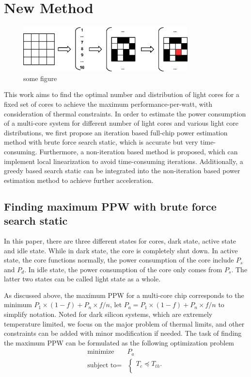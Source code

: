 \section{New Method}


\begin{figure}[htb]
\centering
\includegraphics[width=0.8\textwidth]{fig/brute_force.eps}
\caption{some figure}
\end{figure}


This work aims to find the optimal number and distribution of light cores for a fixed set of cores to achieve the maximum performance-per-watt, with consideration of thermal constraints. In order to estimate the power consumption of a multi-core system for different number of light cores and various light core distributions, we first propose an iteration based full-chip power estimation method with brute force search static, which is accurate but very time-consuming. Furthermore, a non-iteration based method is proposed, which can implement local linearization to avoid time-consuming iterations. Additionally, a greedy based search static can be integrated into the non-iteration based power estimation method to achieve further acceleration.

\subsection{Finding maximum PPW with brute force search static}
In this paper, there are three different states for cores, dark state, active state and idle state. While in dark state, the core is completely shut down. In active state, the core functions normally, the power consumption of the core include $P_{s}$ and $P_{d}$. In idle state, the power consumption of the core only comes from $P_{s}$. The latter two states can be called light state as a whole.

As discussed above, the maximum PPW for a multi-core chip corresponds to the minimum $P_{1} \times (1-f)+P_{n} \times f/n$, let $P_{a} = P_{1} \times (1-f)+P_{n} \times f/n$ to simplify notation. Noted for dark silicon systems, which are extremely temperature limited, we focus on the major problem of thermal limits, and other constraints can be added with minor modification if needed. The task of finding the maximum PPW can be formulated as the following optimization problem
\begin{equation}
\begin{split}
\text{minimize } & P_{a}\\
\text{subject to} = &\left\{
\begin{array}{c}
T_{c} \preceq T_{th}.\\
\end{array}
\right.
\end{split}
\end{equation}

